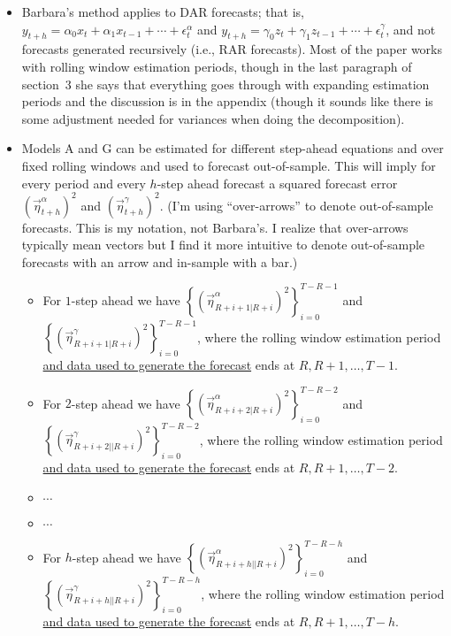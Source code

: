 \documentclass[11pt]{article}
\begin{document}
\begin{itemize}
\item Barbara's method applies to DAR forecasts; that is, $y_{t+h}=\alpha_{0}x_{t}+\alpha_{1}x_{t-1}+\cdots+\epsilon^{\alpha}_{t}$ and $y_{t+h}=\gamma_{0}z_{t}+\gamma_{1}z_{t-1}+\cdots+\epsilon^{\gamma}_{t}$, and not forecasts generated recursively (i.e., RAR forecasts).  Most of the paper works with rolling window estimation periods, though in the last paragraph of section~3 she says that everything goes through with expanding estimation periods and the discussion is in the appendix (though it sounds like there is some adjustment needed for variances when doing the decomposition).
\item Models A and G can be estimated for different step-ahead equations and over fixed rolling windows and used to forecast out-of-sample.  This will imply for every period and every $h$-step ahead forecast a squared forecast error $\left(\overrightarrow{\eta}^{\alpha}_{t+h}\right)^{2}$ and
 $\left(\overrightarrow{\eta}^{\gamma}_{t+h}\right)^{2}$.  (I'm using ``over-arrows'' to denote out-of-sample forecasts.  This is my notation, not Barbara's. I realize that over-arrows typically mean vectors but I find it more intuitive to denote out-of-sample forecasts with an arrow and in-sample with a bar.)
\begin{itemize}
\item For $1$-step ahead we have $\left\{\left(\overrightarrow{\eta}^{\alpha}_{R+i+1|R+i}\right)^{2}\right\}_{i=0}^{T-R-1}$ and $\left\{\left(\overrightarrow{\eta}^{\gamma}_{R+i+1|R+i}\right)^{2}\right\}_{i=0}^{T-R-1}$, where the rolling window estimation period \underline{and data used to generate the forecast}
ends at $R, R+1, \dots, T-1$.
\item For $2$-step ahead we have $\left\{\left(\overrightarrow{\eta}^{\alpha}_{R+i+2|R+i}\right)^{2}\right\}_{i=0}^{T-R-2}$ and $\left\{\left(\overrightarrow{\eta}^{\gamma}_{R+i+2||R+i}\right)^{2}\right\}_{i=0}^{T-R-2}$, where the rolling window estimation period \underline{and data used to generate the forecast} ends at $R, R+1, \dots, T-2$.
\item $\cdots$
\item $\cdots$
\item For $h$-step ahead we have $\left\{\left(\overrightarrow{\eta}^{\alpha}_{R+i+h||R+i}\right)^{2}\right\}_{i=0}^{T-R-h}$ and $\left\{\left(\overrightarrow{\eta}^{\gamma}_{R+i+h||R+i}\right)^{2}\right\}_{i=0}^{T-R-h}$, where the rolling window estimation period \underline{and data used to generate the forecast} ends at $R, R+1, \dots, T-h$.

\end{itemize}
\end{itemize}
\end{document}

